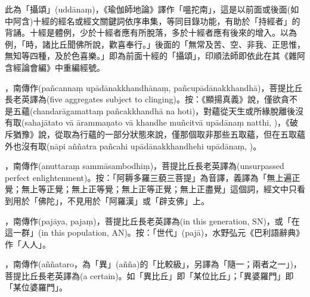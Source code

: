 \startitemgroup[noteitems]
\item{}此為「攝頌」(uddānaṃ)，《瑜伽師地論》譯作「嗢拕南」，這是以前面或後面(如中阿含)十經的經名或經文關鍵詞依序串集，等同目錄功能，有助於「持經者」的背誦。十經是體例，少於十經者應有所脫落，多於十經者應有後來的增入。以為例，「時，諸比丘聞佛所說，歡喜奉行。」後面的「無常及苦、空、非我、正思惟，無知等四種，及於色喜樂。」即為前面十經的「攝頌」，印順法師即依此在其《雜阿含經論會編》中重編經號。
\stopitemgroup

\startitemgroup[noteitems]
\item{}，南傳作(pañcannaṃ upādānakkhandhānaṃ, pañcupādānakkhandhā)，菩提比丘長老英譯為(five aggregates subject to clinging)。按：《顯揚真義》說，僅欲貪不是五蘊(chandarāgamattaṃ pañcakkhandhā na hoti)，對蘊從天生或所緣脫離後沒有取(sahajātato vā ārammaṇato vā khandhe muñcitvā upādānaṃ natthi, )，《破斥猶豫》說，從取為行蘊的一部分狀態來說，僅那個取非那些五取蘊，但在五取蘊外也沒有取(nāpi aññatra pañcahi upādānakkhandhehi upādānaṃ, )。
\stopitemgroup

\startitemgroup[noteitems]
\item{}，南傳作(anuttaraṃ sammāsambodhiṃ)，菩提比丘長老英譯為(unsurpassed perfect enlightenment)。按：「阿耨多羅三藐三菩提」為音譯，義譯為「無上遍正覺；無上等正覺；無上正等覺；無上正等正覺；無上正盡覺」這個詞，經文中只看到用於「佛陀」，不見用於「阿羅漢」或「辟支佛」上。
\stopitemgroup

\startitemgroup[noteitems]
\item{}，南傳作(pajāya, pajaṃ)，菩提比丘長老英譯為(in this generation, SN)，或「在這一群」(in this population, AN)。按：「世代」(pajā)，水野弘元《巴利語辭典》作「人人」。
\stopitemgroup

\startitemgroup[noteitems]
\item{}，南傳作(aññataro，為「異」(añña)的「比較級」，另譯為「隨一；兩者之一」)，菩提比丘長老英譯為(a certain)。如「異比丘」即「某位比丘」；「異婆羅門」即「某位婆羅門」。
\stopitemgroup

